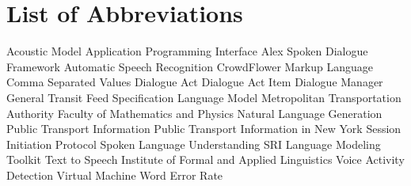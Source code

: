 \chapter*{List of Abbreviations}

\begin{acronym}[TDMA]
     {Acoustic Model}
     {Application Programming Interface}
     {Alex Spoken Dialogue Framework}
     {Automatic Speech Recognition}
     {CrowdFlower Markup Language}
     {Comma Separated Values}
     {Dialogue Act}
     {Dialogue Act Item}
     {Dialogue Manager}
     {General Transit Feed Specification}
     {Language Model}
     {Metropolitan Transportation Authority}
     {Faculty of Mathematics and Physics}
     {Natural Language Generation}
     {Public Transport Information}
     {Public Transport Information in New York}
     {Session Initiation Protocol}
     {Spoken Language Understanding}
     {SRI Language Modeling Toolkit}
     {Text to Speech}
     {Institute of Formal and Applied Linguistics}
     {Voice Activity Detection}
     {Virtual Machine}
     {Word Error Rate}
\end{acronym}

